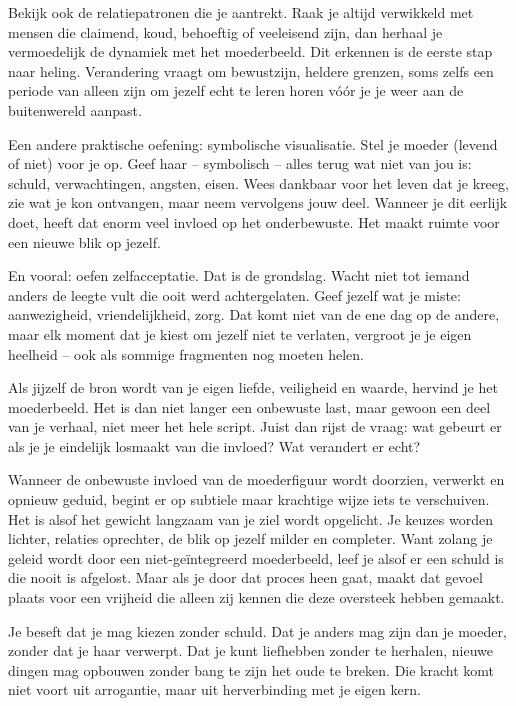 Bekijk ook de relatiepatronen die je aantrekt. Raak je altijd verwikkeld met mensen die claimend, koud, behoeftig of veeleisend zijn, dan herhaal je vermoedelijk de dynamiek met het moederbeeld. Dit erkennen is de eerste stap naar heling. Verandering vraagt om bewustzijn, heldere grenzen, soms zelfs een periode van alleen zijn om jezelf echt te leren horen vóór je je weer aan de buitenwereld aanpast.

Een andere praktische oefening: symbolische visualisatie. Stel je moeder (levend of niet) voor je op. Geef haar – symbolisch – alles terug wat niet van jou is: schuld, verwachtingen, angsten, eisen. Wees dankbaar voor het leven dat je kreeg, zie wat je kon ontvangen, maar neem vervolgens jouw deel. Wanneer je dit eerlijk doet, heeft dat enorm veel invloed op het onderbewuste. Het maakt ruimte voor een nieuwe blik op jezelf.

En vooral: oefen zelfacceptatie. Dat is de grondslag. Wacht niet tot iemand anders de leegte vult die ooit werd achtergelaten. Geef jezelf wat je miste: aanwezigheid, vriendelijkheid, zorg. Dat komt niet van de ene dag op de andere, maar elk moment dat je kiest om jezelf niet te verlaten, vergroot je je eigen heelheid – ook als sommige fragmenten nog moeten helen.

Als jijzelf de bron wordt van je eigen liefde, veiligheid en waarde, hervind je het moederbeeld. Het is dan niet langer een onbewuste last, maar gewoon een deel van je verhaal, niet meer het hele script. Juist dan rijst de vraag: wat gebeurt er als je je eindelijk losmaakt van die invloed? Wat verandert er echt?

Wanneer de onbewuste invloed van de moederfiguur wordt doorzien, verwerkt en opnieuw geduid, begint er op subtiele maar krachtige wijze iets te verschuiven. Het is alsof het gewicht langzaam van je ziel wordt opgelicht. Je keuzes worden lichter, relaties oprechter, de blik op jezelf milder en completer. Want zolang je geleid wordt door een niet-geïntegreerd moederbeeld, leef je alsof er een schuld is die nooit is afgelost. Maar als je door dat proces heen gaat, maakt dat gevoel plaats voor een vrijheid die alleen zij kennen die deze oversteek hebben gemaakt.

Je beseft dat je mag kiezen zonder schuld. Dat je anders mag zijn dan je moeder, zonder dat je haar verwerpt. Dat je kunt liefhebben zonder te herhalen, nieuwe dingen mag opbouwen zonder bang te zijn het oude te breken. Die kracht komt niet voort uit arrogantie, maar uit herverbinding met je eigen kern.


